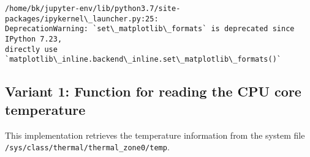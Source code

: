 \documentclass [oneside,10pt,a4paper,ngerman,BCOR10mm,headsepline,parindent,final]{scrartcl}
\begin{document}
    \begin{Verbatim}[commandchars=\\\{\}]
/home/bk/jupyter-env/lib/python3.7/site-packages/ipykernel\_launcher.py:25:
DeprecationWarning: `set\_matplotlib\_formats` is deprecated since IPython 7.23,
directly use `matplotlib\_inline.backend\_inline.set\_matplotlib\_formats()`
    \end{Verbatim}

    \hypertarget{variant-1-function-for-reading-the-cpu-core-temperature}{%
\subsection{Variant 1: Function for reading the CPU core
temperature}\label{variant-1-function-for-reading-the-cpu-core-temperature}}

This implementation retrieves the temperature information from the
system file \texttt{/sys/class/thermal/thermal\_zone0/temp}.
\end{document}
